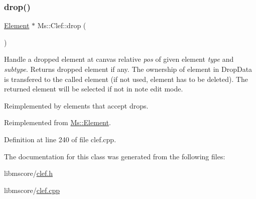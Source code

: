 \subsubsection{\texorpdfstring{drop()}{drop()}}
{\footnotesize\ttfamily \hyperlink{class_ms_1_1_element}{Element} $\ast$ Ms\+::\+Clef\+::drop (\begin{DoxyParamCaption}\item[{\hyperlink{class_ms_1_1_edit_data}{Edit\+Data} \&}]{ }\end{DoxyParamCaption})\hspace{0.3cm}{\ttfamily [virtual]}}

Handle a dropped element at canvas relative {\itshape pos} of given element {\itshape type} and {\itshape subtype}. Returns dropped element if any. The ownership of element in Drop\+Data is transfered to the called element (if not used, element has to be deleted). The returned element will be selected if not in note edit mode.

Reimplemented by elements that accept drops. 

Reimplemented from \hyperlink{class_ms_1_1_element_a0ca69a9fb48e7b9fb481aacaf3860032}{Ms\+::\+Element}.



Definition at line 240 of file clef.\+cpp.



The documentation for this class was generated from the following files\+:\begin{DoxyCompactItemize}
\item 
libmscore/\hyperlink{clef_8h}{clef.\+h}\item 
libmscore/\hyperlink{clef_8cpp}{clef.\+cpp}\end{DoxyCompactItemize}
